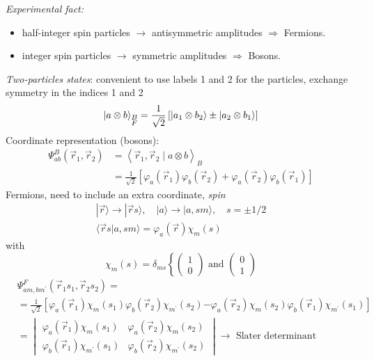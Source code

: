 \documentclass[12pt]{article}
\newcommand{\be}{\begin{equation}}
\newcommand{\ee}{\end{equation}}
\begin{document}

\emph{Experimental fact:}
\begin{itemize}
\item half-integer spin particles $\rightarrow$ antisymmetric amplitudes $\Rightarrow$ Fermions.
\item integer spin particles $\rightarrow$ symmetric amplitudes $\Rightarrow$ Bosons.
\end{itemize}

\emph{Two-particles states}: convenient to use labels 1 and 2
for the particles, exchange symmetry
in the indices 1 and 2
\be
\ket{a\otimes b}_{\substack{B\\F}} = \frac{1}{\sqrt{2}}
\left[
\ket{a_1 \otimes b_2} \pm \ket{a_2 \otimes b_1} 
\right]
\label{eq:g13}
\ee
Coordinate representation (bosons):
\be
\begin{aligned}
\Psi_{a b}^{B}\left(\vec{r}_{1}, \vec{r}_{2}\right)
&=\left\langle\vec{r}_{1}, \vec{r}_{2} \mid a \otimes b\right\rangle_{B}\\
&=\frac{1}{\sqrt{2}}\left[\varphi_{a}\left(\vec{r}_{1}\right) \varphi_{b}\left(\vec{r}_{2}\right)+\varphi_{a}\left(\vec{r}_{2}\right) \varphi_{b}\left(\vec{r}_{1}\right)\right]
\end{aligned}
\label{eq:g14}
\ee
%
Fermions, need to include an extra coordinate, \emph{spin}
\be
\begin{gathered}
|\vec{r}\rangle \rightarrow|\vec{r} s\rangle,\quad|a\rangle \rightarrow| a, s m\rangle,\quad s=\pm1/2\\
\langle\vec{r} s | a, s m\rangle=\varphi_{a}(\vec{r}) \chi_{m}(s)
\end{gathered}
\ee
with
\[
\chi_{m}(s)=\delta_{m s}\left\{
\begin{pmatrix}1 \\ 0\end{pmatrix} \text{ and }
\begin{pmatrix}0 \\ 1\end{pmatrix}\right.
\]
\be
\begin{aligned}
&\Psi_{a m, b m^{\prime}}^{F}\left(\vec{r}_{1} s_{1}, \vec{r}_{2} s_{2}\right) = \\
&=\frac{1}{\sqrt{2}}
\left[\varphi_{a}\left(\vec{r}_{1}\right) \chi_{m}\left(s_{1}\right) \varphi_{b}\left(\vec{r}_{2}\right) \chi_{m^{\prime}}\left(s_{2}\right)\right.
\left.-\varphi_{a}\left(\vec{r}_{2}\right) \chi_{m}\left(s_{2}\right) \varphi_{b}\left(\vec{r}_{1}\right) \chi_{m^{\prime}}\left(s_{1}\right)\right]\\
&=
\begin{vmatrix}
\varphi_{a}\left(\vec{r}_{1}\right) \chi_{m}\left(s_{1}\right)  & 
\varphi_{a}\left(\vec{r}_{2}\right) \chi_{m}\left(s_{2}\right) \\
\varphi_{b}\left(\vec{r}_{1}\right) \chi_{m^{\prime}}\left(s_{1}\right)&
\varphi_{b}\left(\vec{r}_{2}\right) \chi_{m^{\prime}}\left(s_{2}\right)
\end{vmatrix}
\rightarrow\text{ Slater determinant}
\end{aligned}
\ee
\end{document}
